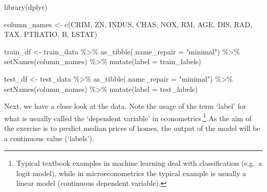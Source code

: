 \documentclass[
  12pt,
]{style/krantz}
\newenvironment{Shaded}{\begin{snugshade}}{\end{snugshade}}
\newcommand{\AttributeTok}[1]{\textcolor[rgb]{0.77,0.63,0.00}{#1}}
\newcommand{\FunctionTok}[1]{\textcolor[rgb]{0.00,0.00,0.00}{#1}}
\newcommand{\NormalTok}[1]{#1}
\newcommand{\OtherTok}[1]{\textcolor[rgb]{0.56,0.35,0.01}{#1}}
\newcommand{\SpecialCharTok}[1]{\textcolor[rgb]{0.00,0.00,0.00}{#1}}
\newcommand{\StringTok}[1]{\textcolor[rgb]{0.31,0.60,0.02}{#1}}
\begin{document}
\begin{Shaded}
\begin{Highlighting}[]
\FunctionTok{library}\NormalTok{(dplyr)}

\NormalTok{column\_names }\OtherTok{\textless{}{-}} \FunctionTok{c}\NormalTok{(}\StringTok{\textquotesingle{}CRIM\textquotesingle{}}\NormalTok{, }\StringTok{\textquotesingle{}ZN\textquotesingle{}}\NormalTok{, }\StringTok{\textquotesingle{}INDUS\textquotesingle{}}\NormalTok{, }\StringTok{\textquotesingle{}CHAS\textquotesingle{}}\NormalTok{, }\StringTok{\textquotesingle{}NOX\textquotesingle{}}\NormalTok{, }\StringTok{\textquotesingle{}RM\textquotesingle{}}\NormalTok{, }\StringTok{\textquotesingle{}AGE\textquotesingle{}}\NormalTok{, }
                  \StringTok{\textquotesingle{}DIS\textquotesingle{}}\NormalTok{, }\StringTok{\textquotesingle{}RAD\textquotesingle{}}\NormalTok{, }\StringTok{\textquotesingle{}TAX\textquotesingle{}}\NormalTok{, }\StringTok{\textquotesingle{}PTRATIO\textquotesingle{}}\NormalTok{, }\StringTok{\textquotesingle{}B\textquotesingle{}}\NormalTok{, }\StringTok{\textquotesingle{}LSTAT\textquotesingle{}}\NormalTok{)}

\NormalTok{train\_df }\OtherTok{\textless{}{-}}\NormalTok{ train\_data }\SpecialCharTok{\%\textgreater{}\%} 
  \FunctionTok{as\_tibble}\NormalTok{(}\AttributeTok{.name\_repair =} \StringTok{"minimal"}\NormalTok{) }\SpecialCharTok{\%\textgreater{}\%} 
  \FunctionTok{setNames}\NormalTok{(column\_names) }\SpecialCharTok{\%\textgreater{}\%} 
  \FunctionTok{mutate}\NormalTok{(}\AttributeTok{label =}\NormalTok{ train\_labels)}

\NormalTok{test\_df }\OtherTok{\textless{}{-}}\NormalTok{ test\_data }\SpecialCharTok{\%\textgreater{}\%} 
  \FunctionTok{as\_tibble}\NormalTok{(}\AttributeTok{.name\_repair =} \StringTok{"minimal"}\NormalTok{) }\SpecialCharTok{\%\textgreater{}\%} 
  \FunctionTok{setNames}\NormalTok{(column\_names) }\SpecialCharTok{\%\textgreater{}\%} 
  \FunctionTok{mutate}\NormalTok{(}\AttributeTok{label =}\NormalTok{ test\_labels)}
\end{Highlighting}
\end{Shaded}

Next, we have a close look at the data. Note the usage of the term `label' for what is usually called the `dependent variable' in econometrics.\footnote{Typical textbook examples in machine learning deal with classification (e.g.~a logit model), while in microeconometrics the typical example is usually a linear model (continuous dependent variable).} As the aim of the exercise is to predict median prices of homes, the output of the model will be a continuous value (`labels').
\end{document}

